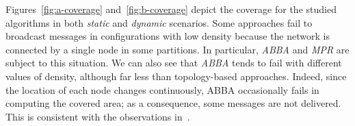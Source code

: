 %
Figures~\ref{fig:a-coverage} and~\ref{fig:b-coverage} depict the coverage for the studied algorithms in both \emph{static} and \emph{dynamic} scenarios.
%
%
Some approaches fail to broadcast messages in configurations with low density because the network is connected by a single node in some partitions. 
%
In particular, \emph{ABBA} and \emph{MPR} are subject to this situation.
%
%
%
%
%
We can also see that \emph{ABBA} tends to fail with different values of density, although far less than topology-based approaches.
%
%
Indeed, since the location of each node changes continuously, ABBA occasionally fails in computing the covered area; as a consequence, some messages are not delivered.
This is consistent with the observations in~\cite{YiGerla2003, Garbinato2010}. 
